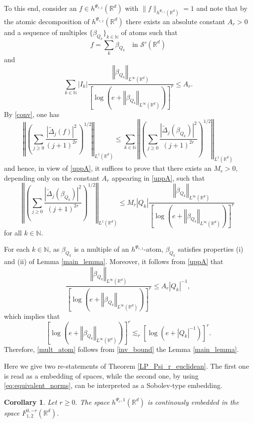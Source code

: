 \documentclass[a4paper, leqno, 10pt]{amsart}
\numberwithin{equation}{section}
\newtheorem{corollary}[thm]{Corollary}
\newcommand{\R}{\mathbb{R}}
\newcommand{\norm}[1]{\left\Vert#1\right\Vert}
\newcommand{\N}{\mathbb{N}}
\begin{document}
To this end, consider an $f \in h^{\Psi_{r,1}} (\R^d)$  with $\| f \|_{h^{\Psi_{r,1}} (\R^d)} = 1$ and note that by the atomic decomposition of $h^{\Psi_{r,1}} (\R^d)$ there exists an absolute constant $A_r>0$ and a sequence of multiples $\{ \beta_{Q_k} \}_{k \in \N}$ of atoms such that
\begin{equation}\label{conv}
f = \sum_k \beta_{Q_k} \quad \text{in } \mathcal{S}'(\R^d) 
\end{equation}
and
\begin{equation}\label{uppA}
\sum_{k \in \N} | I_k | \frac{ \norm{ \beta_{Q_k} }_{L^{\infty} (\R^d)} }{ \left[ \log \left( e + \norm{ \beta_{Q_k} }_{L^{\infty} (\R^d)} \right) \right]^r } \leq A_r . 
\end{equation}
By \eqref{conv}, one has
\[
\norm{ \left( \sum_{j \geq 0} \frac{ | \widetilde{\Delta}_j (f)  |^2}{(j+1)^{2r}} \right)^{1/2} }_{L^1 (\R^d)} \leq \sum_{k \in \N} \norm{ \left( \sum_{j \geq 0} \frac{ | \widetilde{\Delta}_j ( \beta_{Q_k} ) |^2}{(j+1)^{2r}} \right)^{1/2} }_{L^1 (\R^d)} 
\]
and hence, in view of \eqref{uppA}, it suffices to prove that there exists an $M_r >0$, depending only on the constant $A_r$ appearing in \eqref{uppA}, such that
\begin{equation}\label{mult_atom}
\norm{ \left( \sum_{j \geq 0} \frac{ | \widetilde{\Delta}_j ( \beta_{Q_k} ) |^2}{(j+1)^{2r}} \right)^{1/2} }_{L^1 (\R^d)} \leq M_r | Q_k | \frac{ \norm{ \beta_{Q_k} }_{L^{\infty} (\R^d)}} { \left[ \log \left(e + \norm{ \beta_{Q_k} }_{L^{\infty} (\R^d)} \right) \right]^r  }
\end{equation}
for all $k \in \N$. 

For each $k \in \N$, as $\beta_{Q_k}$ is a multiple of an $h^{\Psi_{r,1}}$-atom, $\beta_{Q_k}$ satisfies properties (i) and (ii) of Lemma \ref{main_lemma}. Moreover, it follows from \eqref{uppA} that
\[
\frac{ \norm{ \beta_{Q_k} }_{L^{\infty} (\R^d)} }{ \left[ \log \left( e + \norm{ \beta_{Q_k} }_{L^{\infty} (\R^d)} \right) \right]^r } \leq A_r | Q_k |^{-1},
\]
which implies that 
\begin{equation}\label{inv_bound}
\left[ \log \left( e + \norm{ \beta_{Q_k} }_{L^{\infty} (\R^d)} \right) \right]^r  \lesssim_r  \left[ \log \left( e + |Q_k|^{-1} \right) \right]^r . 
\end{equation}
Therefore, \eqref{mult_atom} follows from \eqref{inv_bound} the Lemma  \ref{main_lemma}.

Here we give two re-statements of Theorem \ref{LP_Psi_r_euclidean}. The first one is read as a embedding of spaces, while the second one, by using  \eqref{eq:equivalent_norms}, can be interpreted as a Sobolev-type embedding.  
\begin{corollary}\label{cor:embedding} Let $r\geq 0$. The space $h^{\Psi_r,1}(\R^d)$ is continously embedded in the space $F^{0,-r}_{1,2}(\R^d)$.
\end{corollary}
\end{document}
